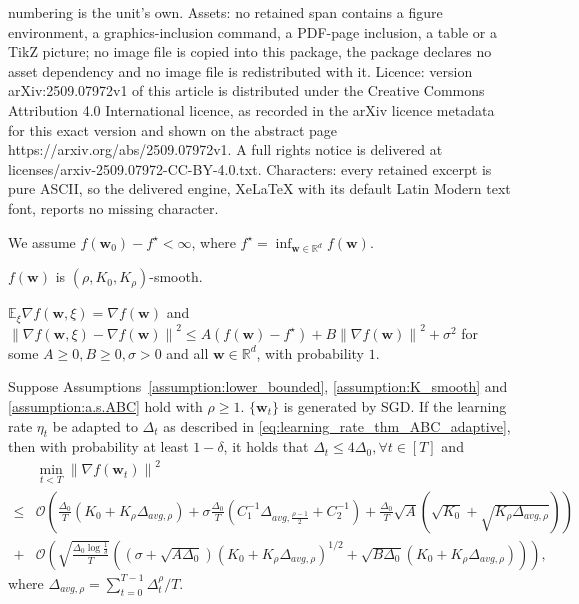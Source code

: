 \documentclass[10pt,a4paper]{amsart}
\newcommand{\EE}{\mathbb{E}}
\newcommand{\Kr}{K_{\rho}}
\newcommand{\Norm}[1]{\left\|#1\right\|}
\newcommand{\bw}{\mathbf{w}}
\newcommand{\paren}[1]{\left( #1 \right)}
\begin{document}
numbering is the unit's own. Assets: no retained span contains a figure environment, a graphics-inclusion command, a PDF-page inclusion, a table or a TikZ picture; no image file is copied into this package, the package declares no asset dependency and no image file is redistributed with it. Licence: version arXiv:2509.07972v1 of this article is distributed under the Creative Commons Attribution 4.0 International licence, as recorded in the arXiv licence metadata for this exact version and shown on the abstract page https://arxiv.org/abs/2509.07972v1. A full rights notice is delivered at licenses/arxiv-2509.07972-CC-BY-4.0.txt. Characters: every retained excerpt is pure ASCII, so the delivered engine, XeLaTeX with its default Latin Modern text font, reports no missing character.
\begin{assumption}\label{assumption:lower_bounded}
    We assume $f(\bw_0)-f^\star<\infty$, where $f^\star=\inf_{\bw\in\mathbb{R}^d} f(\bw)$.
\end{assumption}

\begin{assumption}\label{assumption:K_smooth}
    $f(\bw)$ is $(\rho,K_0,\Kr)$-smooth.
\end{assumption}

\begin{assumption}\label{assumption:a.s.ABC}
    $\EE_\xi \nabla f(\bw,\xi)=\nabla f(\bw)$ and $\Norm{\nabla f(\bw,\xi)-\nabla f(\bw)}^2\leq A\paren{f(\bw)-f^\star}+B\Norm{\nabla f(\bw)}^2+ \sigma^2$ for some $A\geq0,B\geq 0, \sigma>0$ and all $\bw\in\mathbb{R}^d$, with probability $1$.
\end{assumption}

\begin{theorem}\label{thm:SGD_adaptive_a.s.ABC}
    Suppose Assumptions~\ref{assumption:lower_bounded}, \ref{assumption:K_smooth} and \ref{assumption:a.s.ABC} hold with $\rho\geq 1$. $\{\bw_t\}$ is generated by SGD. 
    If the learning rate $\eta_t$ be adapted to $\Delta_t$ as described in \eqref{eq:learning_rate_thm_ABC_adaptive},
    then with probability at least $1-\delta$, it holds that 
    $\Delta_t\leq 4\Delta_0,\forall t\in[T]$ and
    \begin{align*}
        &\min_{t<T} \Norm{\nabla f(\bw_t)}^2\\
        \leq&
        \mathcal{O}\paren{\frac{\Delta_0}{T}\paren{K_0+\Kr\Delta_{avg,\rho}}+\sigma\frac{\Delta_0}{T}\paren{C_1^{-1}\Delta_{avg,\frac{\rho-1}{2}}+C_2^{-1}}
        +\frac{\Delta_0}{T}\sqrt{A}\paren{\sqrt{K_0}+\sqrt{\Kr\Delta_{avg,\rho}}}}\\
        +&\mathcal{O}\paren{\sqrt{\frac{\Delta_0\log\frac{1}{\delta}}{T}}\paren{ \paren{\sigma+\sqrt{A\Delta_0}}\paren{K_0+\Kr\Delta_{avg,\rho}}^{1/2}+\sqrt{B\Delta_0}\paren{K_0+\Kr\Delta_{avg,\rho}}}},
    \end{align*}
    where $\Delta_{avg,\rho}=\sum_{t=0}^{T-1}\Delta_t^\rho/T$.
\end{theorem}
\end{document}
